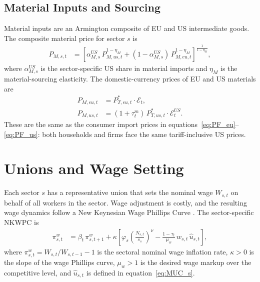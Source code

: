 \documentclass[12pt,a4paper]{article}
\begin{document}
\subsection{Material Inputs and Sourcing}

Material inputs are an Armington composite of EU and US intermediate goods. The composite material price for sector $s$ is
\begin{align}
    P_{M,s,t} &= \left[
        \alpha^{US}_{M,s}\,P_{M,us,t}^{1-\eta_M}
        + (1-\alpha^{US}_{M,s})\,P_{M,eu,t}^{1-\eta_M}
    \right]^{\!\frac{1}{1-\eta_M}},
    \label{eq:PM_s}
\end{align}
where $\alpha^{US}_{M,s}$ is the sector-specific US share in material imports and $\eta_M$ is the material-sourcing elasticity. The domestic-currency prices of EU and US materials are
\begin{align}
    P_{M,eu,t} &= P^*_{T,eu,t}\cdot\mathcal{E}_t,
    \label{eq:PM_eu}\\
    P_{M,us,t} &= (1+\tau^m_t)\,P^*_{T,us,t}\cdot\mathcal{E}^{US}_t.
    \label{eq:PM_us}
\end{align}
These are the same as the consumer import prices in equations~\eqref{eq:PF_eu}--\eqref{eq:PF_us}: both households and firms face the same tariff-inclusive US prices.


\section{Unions and Wage Setting}
\label{sec:unions}

Each sector $s$ has a representative union that sets the nominal wage $W_{s,t}$ on behalf of all workers in the sector. Wage adjustment is costly, and the resulting wage dynamics follow a New Keynesian Wage Phillips Curve \citep[e.g.,][]{erceg_henderson_levin_2000}. The sector-specific NKWPC is
\begin{align}
    \pi^w_{s,t} &= \beta_t\,\pi^w_{s,t+1}
        + \kappa\left[
            \varphi_s\!\left(\frac{N_{s,t}}{s_s}\right)^{\!\nu}
            - \frac{1-\tau_t}{\mu_w}\,w_{s,t}\,\hat{u}_{s,t}
        \right],
    \label{eq:NKWPC}
\end{align}
where $\pi^w_{s,t} = W_{s,t}/W_{s,t-1} - 1$ is the sectoral nominal wage inflation rate, $\kappa > 0$ is the slope of the wage Phillips curve, $\mu_w > 1$ is the desired wage markup over the competitive level, and $\hat{u}_{s,t}$ is defined in equation~\eqref{eq:MUC_s}.
\end{document}
